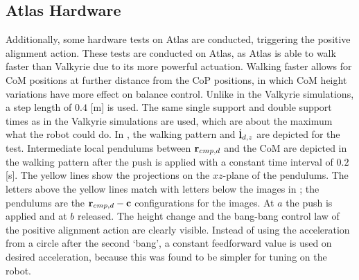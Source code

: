 \subsection{Atlas Hardware}
Additionally, some hardware tests on Atlas are conducted, triggering the positive alignment action. These tests are conducted on Atlas, as Atlas is able to walk faster than Valkyrie due to its more powerful actuation. Walking faster allows for \ac{CoM} positions at further distance from the \ac{CoP} positions, in which \ac{CoM} height variations have more effect on balance control. Unlike in the Valkyrie simulations, a step length of $0.4$ [m] is used. The same single support and double support times as in the Valkyrie simulations are used, which are about the maximum what the robot could do. In , the walking pattern and $\dot{\mathbf{l}}_{d,z}$ are depicted for the test. Intermediate local pendulums between $\mathbf{r}_{cmp,d}$ and the \ac{CoM} are depicted in the walking pattern after the push is applied with a constant time interval of $0.2$ [s]. The yellow lines show the projections on the $xz$-plane of the pendulums. The letters above the yellow lines match with letters below the images in ; the pendulums are the $\mathbf{r}_{cmp,d}-\mathbf{c}$ configurations for the images. At $a$ the push is applied and at $b$ released. The height change and the bang-bang control law of the positive alignment action are clearly visible. Instead of using the acceleration from a circle after the second `bang', a constant feedforward value is used on desired acceleration, because this was found to be simpler for tuning on the robot.
